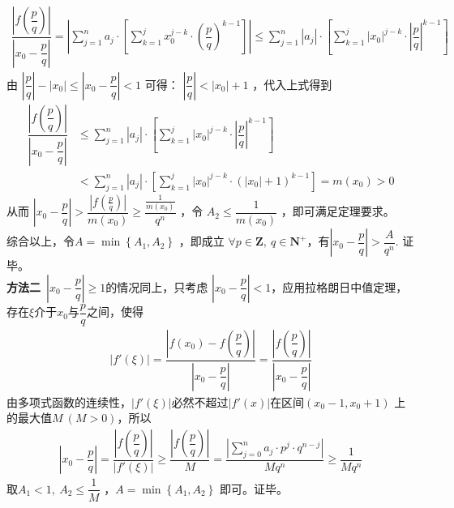 \begin{itemize}[leftmargin=\inteval{\myitemleftmargin}pt,itemsep=
   \inteval{\myitemitempsep}pt,topsep=\inteval{\myitemtopsep}pt]
\begin{align}\label{刘维尔定理1}
    \dfrac{\left|f\left(\dfrac{p}{q}\right)\right|}{\left|x_0-\dfrac{p}{q}\right|}=\left|\sum_{j=1}^{n}a_{j}\cdot \left[\sum_{k=1}^{j}x_0^{j-k}\cdot \left(\dfrac{p}{q}\right)^{k-1}\right]\right|\leq \sum_{j=1}^{n}\left|a_{j}\right|\cdot \left[\sum_{k=1}^{j}|x_0|^{j-k}\cdot \left|\dfrac{p}{q}\right|^{k-1}\right]
\end{align}
由 $ \left|\dfrac{p}{q}\right|-|x_0|\leq \left|x_0-\dfrac{p}{q}\right|<1 $ 可得：
$ \left|\dfrac{p}{q}\right|<|x_0|+1 $ ，代入上式得到
\begin{align*}
    \dfrac{\left|f\left(\dfrac{p}{q}\right)\right|}{\left|x_0-\dfrac{p}{q}\right|} 
    &\leq \sum_{j=1}^{n}\left|a_{j}\right|\cdot \left[\sum_{k=1}^{j}|x_0|^{j-k}\cdot \left|\dfrac{p}{q}\right|^{k-1}\right]\\ &<\sum_{j=1}^{n}\left|a_{j}\right|\cdot \left[\sum_{k=1}^{j}|x_0|^{j-k}\cdot (|x_0|+1)^{k-1}\right]=m(x_0)>0
\end{align*}
从而 $ \left|x_0-\dfrac{p}{q}\right|>\dfrac{\left|f\left(\frac{p}{q}\right)\right|}{m(x_0)}\geq \dfrac{\frac{1}{m(x_0)}}{q^{n}} $ ，令 $ A_{2}\leq \dfrac{1}{m(x_0)} $ ，即可满足定理要求。\\
综合以上，令$ A=\min\left\{A_{1},A_{2}\right\} $ ，即成立 $ \forall p\in\textbf{Z},\ q\in\textbf{N}^{+} $，有$ \left|x_0-\dfrac{p}{q}\right|>\dfrac{A}{q^{n}} $. 证毕。\\
\textbf{方法二}\ $ \left|x_0-\dfrac{p}{q}\right|\geq 1 $的情况同上，只考虑
$ \left|x_0-\dfrac{p}{q}\right|<1 $，应用拉格朗日中值定理，
存在$ \xi $介于$ x_0 $与$ \dfrac{p}{q} $之间，使得
\begin{gather*}
    |f'(\xi)|=\dfrac{\left|f(x_0)-f\left(\dfrac{p}{q}\right)
        \right|}{\left|x_0 -\dfrac{p}{q}\right|}=
    \dfrac{\left|f\left(\dfrac{p}{q}\right)
        \right|}{\left|x_0-\dfrac{p}{q}\right|}
\end{gather*}
由多项式函数的连续性，$ |f'(\xi)| $必然不超过$ |f'(x)| $在区间$ (x_0-1,x_0+1) $
上的最大值$ M\ (M>0) $，所以
\begin{gather*}
    \left|x_0-\dfrac{p}{q}\right|=
    \dfrac{\left|f\left(\dfrac{p}{q}\right)\right|}{\left|f'(\xi)\right|}\geq 
    \dfrac{\left|f\left(\dfrac{p}{q}\right)\right|}{M}=
    \dfrac{\left|\sum\limits_{j=0}^{n}a_{j}\cdot p^{j}\cdot q^{n-j}\right|}{Mq^{n}}\geq \dfrac{1}{Mq^{n}}
\end{gather*}
取$ A_1<1,\ A_2\leq \dfrac{1}{M} $ ，$ A=\min\left\{A_{1},A_{2}\right\} $ 即可。证毕。


\end{itemize}
